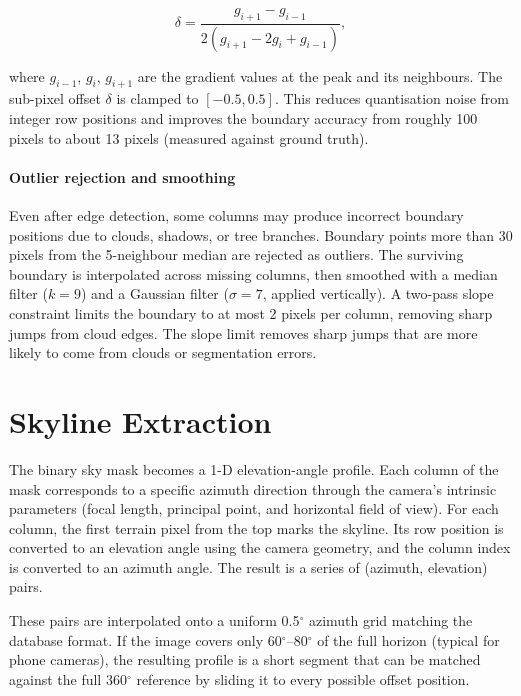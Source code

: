 \begin{equation}
\delta = \frac{g_{i+1} - g_{i-1}}{2(g_{i+1} - 2g_i + g_{i-1})},
\end{equation}

\noindent where $g_{i-1}$, $g_i$, $g_{i+1}$ are the gradient values at the peak and its neighbours. The sub-pixel offset $\delta$ is clamped to $[-0.5, 0.5]$. This reduces quantisation noise from integer row positions and improves the boundary accuracy from roughly 100 pixels to about 13 pixels (measured against ground truth).

\paragraph{Outlier rejection and smoothing} Even after edge detection, some columns may produce incorrect boundary positions due to clouds, shadows, or tree branches. Boundary points more than 30 pixels from the 5-neighbour median are rejected as outliers. The surviving boundary is interpolated across missing columns, then smoothed with a median filter ($k=9$) and a Gaussian filter ($\sigma = 7$, applied vertically). A two-pass slope constraint limits the boundary to at most 2 pixels per column, removing sharp jumps from cloud edges. The slope limit removes sharp jumps that are more likely to come from clouds or segmentation errors.

\section{Skyline Extraction}
\label{sec:extraction}

The binary sky mask becomes a 1-D elevation-angle profile. Each column of the mask corresponds to a specific azimuth direction through the camera's intrinsic parameters (focal length, principal point, and horizontal field of view). For each column, the first terrain pixel from the top marks the skyline. Its row position is converted to an elevation angle using the camera geometry, and the column index is converted to an azimuth angle. The result is a series of (azimuth, elevation) pairs.

These pairs are interpolated onto a uniform 0.5$^\circ$ azimuth grid matching the database format. If the image covers only 60$^\circ$--80$^\circ$ of the full horizon (typical for phone cameras), the resulting profile is a short segment that can be matched against the full 360$^\circ$ reference by sliding it to every possible offset position.

